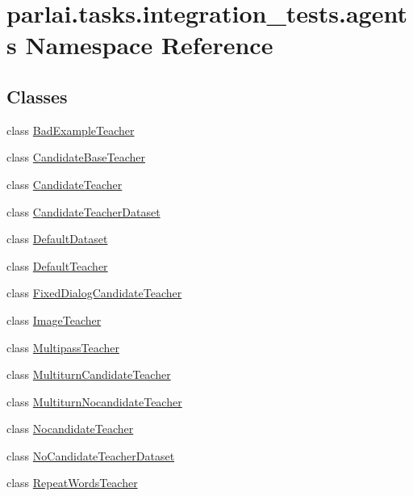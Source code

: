 \hypertarget{namespaceparlai_1_1tasks_1_1integration__tests_1_1agents}{}\section{parlai.\+tasks.\+integration\+\_\+tests.\+agents Namespace Reference}
\label{namespaceparlai_1_1tasks_1_1integration__tests_1_1agents}
\subsection*{Classes}
\begin{DoxyCompactItemize}
\item 
class \hyperlink{classparlai_1_1tasks_1_1integration__tests_1_1agents_1_1BadExampleTeacher}{Bad\+Example\+Teacher}
\item 
class \hyperlink{classparlai_1_1tasks_1_1integration__tests_1_1agents_1_1CandidateBaseTeacher}{Candidate\+Base\+Teacher}
\item 
class \hyperlink{classparlai_1_1tasks_1_1integration__tests_1_1agents_1_1CandidateTeacher}{Candidate\+Teacher}
\item 
class \hyperlink{classparlai_1_1tasks_1_1integration__tests_1_1agents_1_1CandidateTeacherDataset}{Candidate\+Teacher\+Dataset}
\item 
class \hyperlink{classparlai_1_1tasks_1_1integration__tests_1_1agents_1_1DefaultDataset}{Default\+Dataset}
\item 
class \hyperlink{classparlai_1_1tasks_1_1integration__tests_1_1agents_1_1DefaultTeacher}{Default\+Teacher}
\item 
class \hyperlink{classparlai_1_1tasks_1_1integration__tests_1_1agents_1_1FixedDialogCandidateTeacher}{Fixed\+Dialog\+Candidate\+Teacher}
\item 
class \hyperlink{classparlai_1_1tasks_1_1integration__tests_1_1agents_1_1ImageTeacher}{Image\+Teacher}
\item 
class \hyperlink{classparlai_1_1tasks_1_1integration__tests_1_1agents_1_1MultipassTeacher}{Multipass\+Teacher}
\item 
class \hyperlink{classparlai_1_1tasks_1_1integration__tests_1_1agents_1_1MultiturnCandidateTeacher}{Multiturn\+Candidate\+Teacher}
\item 
class \hyperlink{classparlai_1_1tasks_1_1integration__tests_1_1agents_1_1MultiturnNocandidateTeacher}{Multiturn\+Nocandidate\+Teacher}
\item 
class \hyperlink{classparlai_1_1tasks_1_1integration__tests_1_1agents_1_1NocandidateTeacher}{Nocandidate\+Teacher}
\item 
class \hyperlink{classparlai_1_1tasks_1_1integration__tests_1_1agents_1_1NoCandidateTeacherDataset}{No\+Candidate\+Teacher\+Dataset}
\item 
class \hyperlink{classparlai_1_1tasks_1_1integration__tests_1_1agents_1_1RepeatWordsTeacher}{Repeat\+Words\+Teacher}
\end{DoxyCompactItemize}
